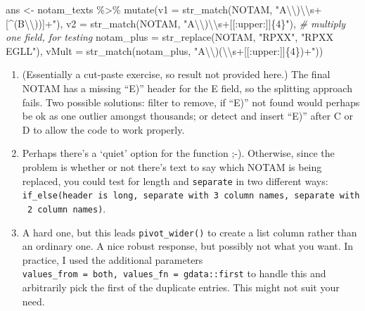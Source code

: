 \documentclass[
]{book}
\newenvironment{Shaded}{\begin{snugshade}}{\end{snugshade}}
\newcommand{\AttributeTok}[1]{\textcolor[rgb]{0.77,0.63,0.00}{#1}}
\newcommand{\CommentTok}[1]{\textcolor[rgb]{0.56,0.35,0.01}{\textit{#1}}}
\newcommand{\FunctionTok}[1]{\textcolor[rgb]{0.00,0.00,0.00}{#1}}
\newcommand{\NormalTok}[1]{#1}
\newcommand{\OtherTok}[1]{\textcolor[rgb]{0.56,0.35,0.01}{#1}}
\newcommand{\SpecialCharTok}[1]{\textcolor[rgb]{0.00,0.00,0.00}{#1}}
\newcommand{\StringTok}[1]{\textcolor[rgb]{0.31,0.60,0.02}{#1}}
\providecommand{\tightlist}{%
  \setlength{\itemsep}{0pt}\setlength{\parskip}{0pt}}
\begin{document}
\begin{Shaded}
\begin{Highlighting}[]
\NormalTok{ans }\OtherTok{\textless{}{-}}\NormalTok{ notam\_texts }\SpecialCharTok{\%\textgreater{}\%} 
  \FunctionTok{mutate}\NormalTok{(}\AttributeTok{v1 =} \FunctionTok{str\_match}\NormalTok{(NOTAM, }\StringTok{"A}\SpecialCharTok{\textbackslash{}\textbackslash{}}\StringTok{)}\SpecialCharTok{\textbackslash{}\textbackslash{}}\StringTok{s+[\^{}(B}\SpecialCharTok{\textbackslash{}\textbackslash{}}\StringTok{))]+"}\NormalTok{),}
         \AttributeTok{v2 =} \FunctionTok{str\_match}\NormalTok{(NOTAM, }\StringTok{"A}\SpecialCharTok{\textbackslash{}\textbackslash{}}\StringTok{)}\SpecialCharTok{\textbackslash{}\textbackslash{}}\StringTok{s+[[:upper:]]\{4\}"}\NormalTok{),}
        \CommentTok{\# multiply one field, for testing }
        \AttributeTok{notam\_plus =} \FunctionTok{str\_replace}\NormalTok{(NOTAM, }\StringTok{"RPXX"}\NormalTok{, }\StringTok{"RPXX EGLL"}\NormalTok{),}
         \AttributeTok{vMult =} \FunctionTok{str\_match}\NormalTok{(notam\_plus, }\StringTok{"A}\SpecialCharTok{\textbackslash{}\textbackslash{}}\StringTok{)(}\SpecialCharTok{\textbackslash{}\textbackslash{}}\StringTok{s+[[:upper:]]\{4\})+"}\NormalTok{))}
\end{Highlighting}
\end{Shaded}

\begin{enumerate}
\def\labelenumi{\arabic{enumi})}
\setcounter{enumi}{7}
\tightlist
\item
  (Essentially a cut-paste exercise, so result not provided here.) The final NOTAM has a missing ``E)'' header for the E field, so the splitting approach fails. Two possible solutions: filter to remove, if ``E)'' not found would perhaps be ok as one outlier amongst thousands; or detect and insert ``E)'' after C or D to allow the code to work properly.
\item
  Perhaps there's a `quiet' option for the function ;-). Otherwise, since the problem is whether or not there's text to say which NOTAM is being replaced, you could test for length and \texttt{separate} in two different ways: \texttt{if\_else(header\ is\ long,\ separate\ with\ 3\ column\ names,\ separate\ with\ 2\ column\ names)}.
\item
  A hard one, but this leads \texttt{pivot\_wider()} to create a list column rather than an ordinary one. A nice robust response, but possibly not what you want. In practice, I used the additional parameters \texttt{values\_from\ =\ both,\ values\_fn\ =\ gdata::first} to handle this and arbitrarily pick the first of the duplicate entries. This might not suit your need.
\end{enumerate}

  
\end{document}
